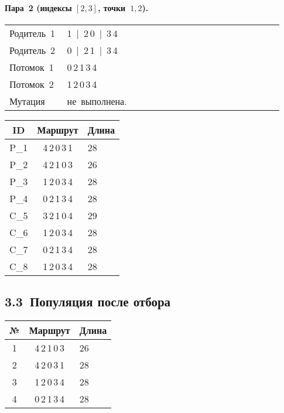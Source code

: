 \documentclass[a4paper,12pt]{article}
\begin{document}
\paragraph{Пара 2 (индексы $[2,3]$, точки $1,2$).}
\begin{longtable}{@{}p{0.18\linewidth}p{0.75\linewidth}@{}}
Родитель 1 & 1 \,|\, 2\,0 \,|\, 3\,4\\
Родитель 2 & 0 \,|\, 2\,1 \,|\, 3\,4\\
Потомок 1  & 0\,2\,1\,3\,4\\
Потомок 2  & 1\,2\,0\,3\,4\\
Мутация    & не выполнена.\\
\end{longtable}

\begin{center}
\begin{tabular}{>{\ttfamily}ccl}
\toprule
ID & Маршрут & Длина\\\midrule
P\_1 & 4\,2\,0\,3\,1 & 28\\
P\_2 & 4\,2\,1\,0\,3 & 26\\
P\_3 & 1\,2\,0\,3\,4 & 28\\
P\_4 & 0\,2\,1\,3\,4 & 28\\ \midrule
C\_5 & 3\,2\,1\,0\,4 & 29\\
C\_6 & 1\,2\,0\,3\,4 & 28\\
C\_7 & 0\,2\,1\,3\,4 & 28\\
C\_8 & 1\,2\,0\,3\,4 & 28\\
\bottomrule
\end{tabular}
\end{center}

\subsection*{3.3 Популяция после отбора}

\begin{center}
\begin{tabular}{ccl}
\toprule
№ & Маршрут & Длина\\\midrule
1 & 4\,2\,1\,0\,3 & 26\\
2 & 4\,2\,0\,3\,1 & 28\\
3 & 1\,2\,0\,3\,4 & 28\\
4 & 0\,2\,1\,3\,4 & 28\\
\bottomrule
\end{tabular}
\end{center}

\end{document}
